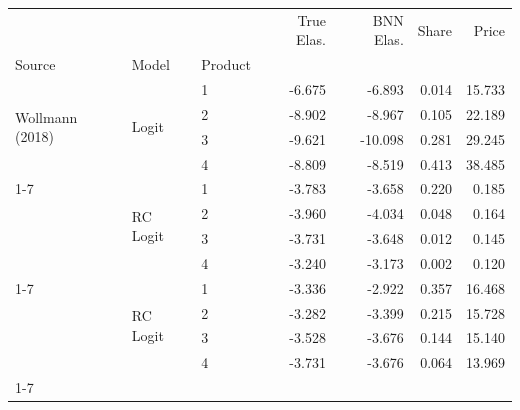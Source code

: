 \begin{tabular}{lllrrrr}
\toprule
 &  &  & True Elas. & BNN Elas. & Share & Price \\
Source & Model & Product &  &  &  &  \\
\midrule
\multirow[t]{4}{*}{Wollmann (2018)} & \multirow[t]{4}{*}{Logit} & 1 & -6.675 & -6.893 & 0.014 & 15.733 \\
 &  & 2 & -8.902 & -8.967 & 0.105 & 22.189 \\
 &  & 3 & -9.621 & -10.098 & 0.281 & 29.245 \\
 &  & 4 & -8.809 & -8.519 & 0.413 & 38.485 \\
\cline{1-7} \cline{2-7}
\multirow[t]{4}{*}{Nevo (2001)} & \multirow[t]{4}{*}{RC Logit} & 1 & -3.783 & -3.658 & 0.220 & 0.185 \\
 &  & 2 & -3.960 & -4.034 & 0.048 & 0.164 \\
 &  & 3 & -3.731 & -3.648 & 0.012 & 0.145 \\
 &  & 4 & -3.240 & -3.173 & 0.002 & 0.120 \\
\cline{1-7} \cline{2-7}
\multirow[t]{4}{*}{BLP (1995)} & \multirow[t]{4}{*}{RC Logit} & 1 & -3.336 & -2.922 & 0.357 & 16.468 \\
 &  & 2 & -3.282 & -3.399 & 0.215 & 15.728 \\
 &  & 3 & -3.528 & -3.676 & 0.144 & 15.140 \\
 &  & 4 & -3.731 & -3.676 & 0.064 & 13.969 \\
\cline{1-7} \cline{2-7}
\bottomrule
\end{tabular}
